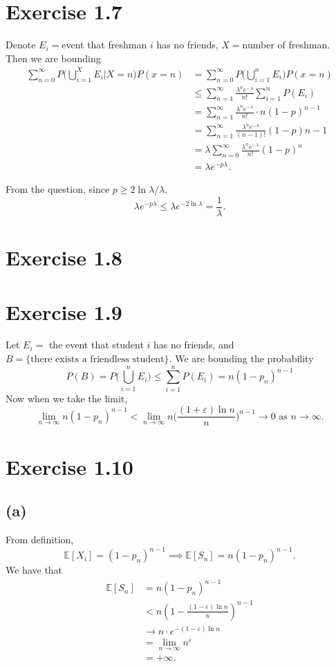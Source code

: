 \section*{Exercise 1.7}
Denote $E_i = $event that freshman $i$ has no friends, $X = $number of freshman. Then we are bounding
\begin{align*}
	\sum_{n = 0}^{\infty} P \biggl( \bigcup_{i = 1}^X E_i \bigg| X = n \biggr) P(x = n)
	&= \sum_{n = 0}^{\infty} P \biggl( \bigcup_{i = 1}^n E_i \biggr) P(x = n) \\
	&\leq \sum_{n = 1}^{\infty} \frac{\lambda^n e^{-\lambda}}{n!} \sum_{i = 1}^{n} P(E_i) \\
	&= \sum_{n = 1}^{\infty} \frac{\lambda^n e^{-\lambda}}{n!} \cdot n(1 - p)^{n - 1} \\
	&= \sum_{n = 1}^{\infty} \frac{\lambda^n e^{-\lambda}}{(n - 1)!} (1 - p){n - 1} \\
	&= \lambda \sum_{n = 0}^{\infty} \frac{\lambda^n e^{-\lambda}}{n!}(1 - p)^n \\
	&= \lambda e^{-p \lambda}.
\end{align*}

From the question, since $p \geq 2 \ln{\lambda} / \lambda$, 
\[ \lambda e^{-p \lambda} \leq \lambda e^{-2 \ln{\lambda}} = \frac{1}{\lambda}. \]


\newpage
\section*{Exercise 1.8}
	

\newpage
\section*{Exercise 1.9}
Let $E_i = $ the event that student $i$ has no friends, and 
$B = \{ \text{there exists a friendless student} \}$. We are bounding the probability 
\[ P(B) 
= P \biggl( \bigcup_{i = 1}^n E_i \biggr) 
\leq \sum_{i = 1}^{n} P(E_i) 
= n(1 - p_n)^{n - 1}
\]
Now when we take the limit, 
\[ \lim_{n \to \infty} n(1 - p_n)^{n - 1} 
< \lim_{n \to \infty} n \biggl( \frac{(1 + \varepsilon) \ln{n}}{n} \biggr)^{n - 1} 
\to 0 \text{  as  } n \to \infty. \]


\newpage
\section*{Exercise 1.10}
\subsection*{(a)}
From definition, 
\[ \mathbb{E}\left[ X_i \right] = (1 - p_n)^{n - 1} \implies 
\mathbb{E}\left[ S_n \right] = n(1 - p_n)^{n - 1}. \]
We have that 
\begin{align*}
	\mathbb{E}\left[ S_n \right] 
	&= n(1 - p_n)^{n - 1} \\
	&< n \left( 1 - \frac{(1 - \varepsilon)\ln{n}}{n} \right)^{n - 1} \\
	&\to n \cdot e^{-(1 - \varepsilon)\ln{n}} \\
	&= \lim_{n \to \infty} n^{\varepsilon} \\
	&= +\infty.
\end{align*}

